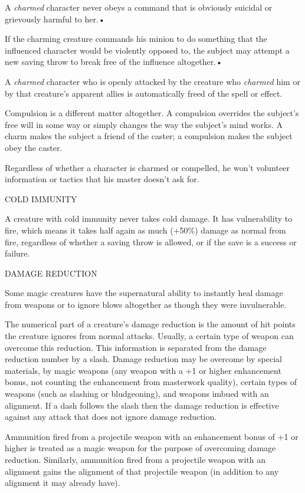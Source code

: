 \documentclass{article}
\begin{document}
A \textit{charmed }character never obeys a command that is obviously suicidal or 
grievously harmful to her.• 

If the charming creature commands his minion to do something that the influenced 
character would be violently opposed to, the subject may attempt a new saving throw 
to break free of the influence altogether.• 

\parindent=7pt
A \textit{charmed }character who is openly attacked by the creature who \textit{charmed 
}him or by that creature's apparent allies is automatically freed of the spell 
or effect.

\parindent=0pt
Compulsion is a different matter altogether. A compulsion overrides the subject's 
free will in some way or simply changes the way the subject's mind works. A charm 
makes the subject a friend of the caster; a compulsion makes the subject obey the 
caster.

Regardless of whether a character is charmed or compelled, he won't volunteer information 
or tactics that his master doesn't ask for.

\vspace{12pt}
COLD IMMUNITY

A creature with cold immunity never takes cold damage. It has vulnerability to 
fire, which means it takes half again as much (+50\%) damage as normal from fire, 
regardless of whether a saving throw is allowed, or if the save is a success or 
failure.

\vspace{12pt}
DAMAGE REDUCTION

Some magic creatures have the supernatural ability to instantly heal damage from 
weapons or to ignore blows altogether as though they were invulnerable.

The numerical part of a creature's damage reduction is the amount of hit points 
the creature ignores from normal attacks. Usually, a certain type of weapon can 
overcome this reduction. This information is separated from the damage reduction 
number by a slash. Damage reduction may be overcome by special materials, by magic 
weapons (any weapon with a +1 or higher enhancement bonus, not counting the enhancement 
from masterwork quality), certain types of weapons (such as slashing or bludgeoning), 
and weapons imbued with an alignment. If a dash follows the slash then the damage 
reduction is effective against any attack that does not ignore damage reduction.

Ammunition fired from a projectile weapon with an enhancement bonus of +1 or higher 
is treated as a magic weapon for the purpose of overcoming damage reduction. Similarly, 
ammunition fired from a projectile weapon with an alignment gains the alignment 
of that projectile weapon (in addition to any alignment it may already have).
\end{document}
